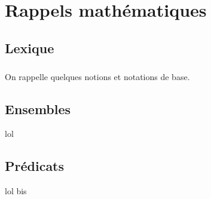 
\chapter{Rappels mathématiques}
\section{Lexique }

\paragraph{}On rappelle quelques notions et notations de base.

\section{Ensembles}

lol

\section{Prédicats}

lol bis
